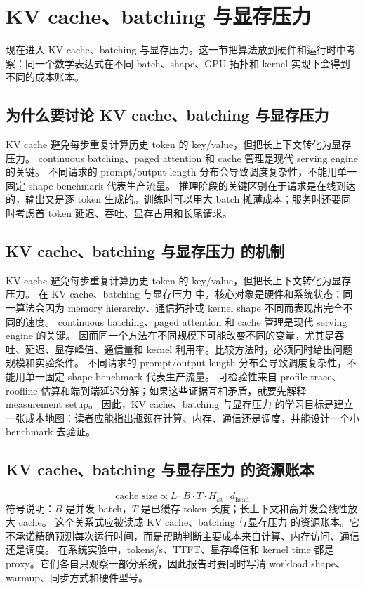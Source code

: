 \documentclass[a4paper]{article}
\begin{document}
\section{KV cache、batching 与显存压力}
现在进入 KV cache、batching 与显存压力。这一节把算法放到硬件和运行时中考察：同一个数学表达式在不同 batch、shape、GPU 拓扑和 kernel 实现下会得到不同的成本账本。
\subsection{为什么要讨论 KV cache、batching 与显存压力}
KV cache 避免每步重复计算历史 token 的 key/value，但把长上下文转化为显存压力。
continuous batching、paged attention 和 cache 管理是现代 serving engine 的关键。
不同请求的 prompt/output length 分布会导致调度复杂性，不能用单一固定 shape benchmark 代表生产流量。
推理阶段的关键区别在于请求是在线到达的，输出又是逐 token 生成的。训练时可以用大 batch 摊薄成本；服务时还要同时考虑首 token 延迟、吞吐、显存占用和长尾请求。
\subsection{KV cache、batching 与显存压力 的机制}
KV cache 避免每步重复计算历史 token 的 key/value，但把长上下文转化为显存压力。 在 KV cache、batching 与显存压力 中，核心对象是硬件和系统状态：同一算法会因为 memory hierarchy、通信拓扑或 kernel shape 不同而表现出完全不同的速度。
continuous batching、paged attention 和 cache 管理是现代 serving engine 的关键。 因而同一个方法在不同规模下可能改变不同的变量，尤其是吞吐、延迟、显存峰值、通信量和 kernel 利用率。比较方法时，必须同时给出问题规模和实验条件。
不同请求的 prompt/output length 分布会导致调度复杂性，不能用单一固定 shape benchmark 代表生产流量。 可检验性来自 profile trace、roofline 估算和端到端延迟分解；如果这些证据互相矛盾，就要先解释 measurement setup。
因此，KV cache、batching 与显存压力 的学习目标是建立一张成本地图：读者应能指出瓶颈在计算、内存、通信还是调度，并能设计一个小 benchmark 去验证。
\subsection{KV cache、batching 与显存压力 的资源账本}
\[\text{cache size}\propto L\cdot B\cdot T\cdot H_{kv}\cdot d_{\text{head}}\]
符号说明：\(B\) 是并发 batch，\(T\) 是已缓存 token 长度；长上下文和高并发会线性放大 cache。
这个关系式应被读成 KV cache、batching 与显存压力 的资源账本。它不承诺精确预测每次运行时间，而是帮助判断主要成本来自计算、内存访问、通信还是调度。
在系统实验中，tokens/s、TTFT、显存峰值和 kernel time 都是 proxy。它们各自只观察一部分系统，因此报告时要同时写清 workload shape、warmup、同步方式和硬件型号。
\end{document}
